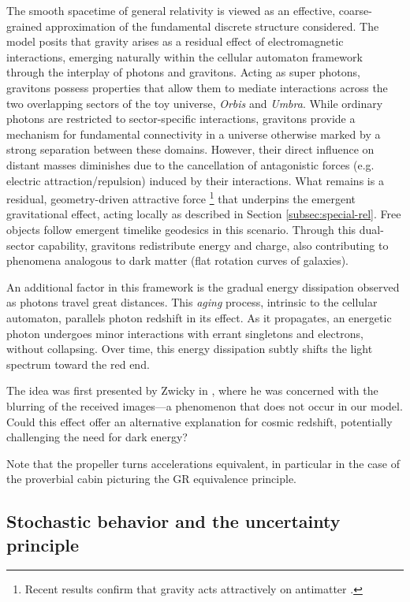 \documentclass[12pt,english]{article}
\begin{document}
 The smooth spacetime of general relativity is viewed as an effective, coarse-grained approximation of the fundamental discrete structure considered. The model posits that gravity arises as a residual effect of electromagnetic interactions, emerging naturally within the cellular automaton framework through the interplay of photons and gravitons. Acting as super photons, gravitons possess properties that allow them to mediate interactions across the two overlapping sectors of the toy universe, \emph{Orbis} and \emph{Umbra}. While ordinary photons are restricted to sector-specific interactions, gravitons provide a mechanism for fundamental connectivity in a universe otherwise marked by a strong separation between these domains. However, their direct influence on distant masses diminishes due to the cancellation of antagonistic forces (e.g. electric attraction/repulsion) induced by their interactions. What remains is a residual, geometry-driven attractive force \footnote{Recent results confirm that gravity acts attractively on antimatter \cite{anderson2023observation}.} that underpins the emergent gravitational effect, acting locally as described in Section \ref{subsec:special-rel}. Free objects follow emergent timelike geodesics in this scenario. Through this dual-sector capability, gravitons redistribute energy and charge, also contributing to phenomena analogous to dark matter (flat rotation curves of galaxies).

An additional factor in this framework is the gradual energy dissipation observed as photons travel great distances. This \textit{aging} process, intrinsic to the cellular automaton, parallels photon redshift in its effect. As it propagates, an energetic photon undergoes minor interactions with errant singletons and electrons, without collapsing. Over time, this energy dissipation subtly shifts the light spectrum toward the red end.

The idea was first presented by Zwicky in \cite{zwicky1929redshift}, where he was concerned with the blurring of the received images—a phenomenon that does not occur in our model. Could this effect offer an alternative explanation for cosmic redshift, potentially challenging the need for dark energy?

Note that the propeller turns accelerations equivalent, in particular in the case of the proverbial cabin picturing the GR equivalence principle.

\subsection{Stochastic behavior and the uncertainty principle}
\end{document}
